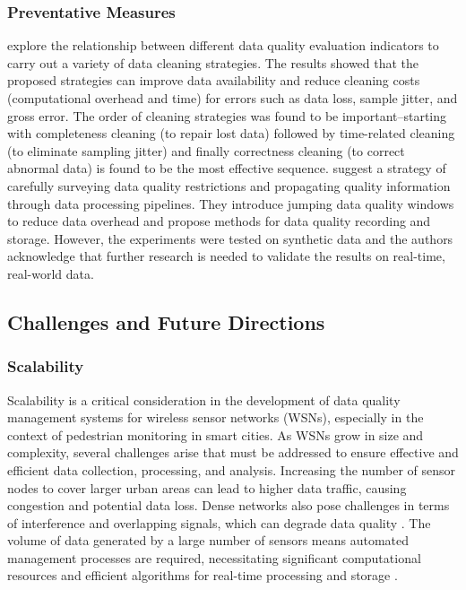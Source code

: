 \subsubsection{Preventative Measures}

\cite{chengDataQualityAnalysis2018} explore the relationship between different data quality evaluation indicators to carry out a variety of data cleaning strategies. The results showed that the proposed strategies can improve data availability and reduce cleaning costs (computational overhead and time) for errors such as data loss, sample jitter, and gross error. The order of cleaning strategies was found to be important--starting with completeness cleaning (to repair lost data) followed by time-related cleaning (to eliminate sampling jitter) and finally correctness cleaning (to correct abnormal data) is found to be the most effective sequence. \cite{kleinRepresentingDataQuality2009} suggest a strategy of carefully surveying data quality restrictions and propagating quality information through data processing pipelines. They introduce jumping data quality windows to reduce data overhead and propose methods for data quality recording and storage. However, the experiments were tested on synthetic data and the authors acknowledge that further research is needed to validate the results on real-time, real-world data.

\subsection{Challenges and Future Directions} \label{ssec:challenges_and_future_directions}

\subsubsection{Scalability}
Scalability is a critical consideration in the development of data quality management systems for wireless sensor networks (WSNs), especially in the context of pedestrian monitoring in smart cities. As WSNs grow in size and complexity, several challenges arise that must be addressed to ensure effective and efficient data collection, processing, and analysis. Increasing the number of sensor nodes to cover larger urban areas can lead to higher data traffic, causing congestion and potential data loss. Dense networks also pose challenges in terms of interference and overlapping signals, which can degrade data quality \cite{akyildizWirelessSensorNetworks2002}. The volume of data generated by a large number of sensors means automated management processes are required, necessitating significant computational resources and efficient algorithms for real-time processing and storage \cite{gubbiInternetThingsIoT2013}.

